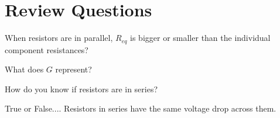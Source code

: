 \documentclass{handout}
\begin{document}
\clearpage


\section{Review Questions}
\begin{questions}
\item When resistors are in parallel, $R_{eq}$ is bigger or smaller than the individual component resistances?


\item What does $G$ represent?


\item How do you know if resistors are in series?


\item True or False.... Resistors in series have the same voltage drop across them.


\newpage


\end{questions}
\end{document}
